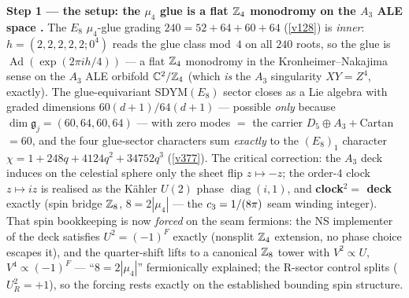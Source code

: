 \par\smallskip\noindent\textbf{Step 1 --- the setup: the $\mu_4$ glue is a flat $\mathbb{Z}_4$ monodromy on the
$A_3$ ALE space \mE.} The $E_8$ $\mu_4$-glue grading
$240=52{+}64{+}60{+}64$ (\vref{v128}) is \emph{inner}: $h=(2,2,2,2,2;0^4)$ reads the glue class mod~$4$
on all $240$ roots, so the glue is $\operatorname{Ad}(\exp(2\pi ih/4))$ --- a flat $\mathbb{Z}_4$ monodromy in
the Kronheimer--Nakajima sense on the $A_3$ ALE orbifold $\mathbb C^2/\mathbb{Z}_4$ (which \emph{is} the $A_3$
singularity $XY=Z^4$, exactly). The glue-equivariant SDYM$(E_8)$ sector closes as a Lie algebra with
graded dimensions $60(d{+}1)/64(d{+}1)$ --- possible \emph{only} because
$\dim\mathfrak g_j=(60,64,60,64)$ --- with zero modes $=$ the carrier $D_5{\oplus}A_3{+}$Cartan $=60$,
and the four glue-sector characters sum \emph{exactly} to the $(E_8)_1$ character
$\chi=1{+}248q{+}4124q^2{+}34752q^3$ (\vref{v377}). The critical correction: the $A_3$ deck induces on
the celestial sphere only the sheet flip $z\mapsto-z$; the order-$4$ clock $z\mapsto iz$ is realised as
the K\"ahler $U(2)$ phase $\operatorname{diag}(i,1)$, and \textbf{clock$^2=$ deck} exactly (spin bridge
$\mathbb{Z}_8$, $8=2|\mu_4|$ --- the $c_3=1/(8\pi)$ seam winding integer).
 That spin bookkeeping is now \emph{forced} on the seam
fermions: the NS implementer of the deck satisfies $U^2=(-1)^F$ exactly (nonsplit $\mathbb{Z}_4$ extension,
no phase choice escapes it), and the quarter-shift lifts to a canonical $\mathbb{Z}_8$ tower with
$V^2\propto U$, $V^4\propto(-1)^F$ --- ``$8=2|\mu_4|$'' fermionically explained; the R-sector
control splits ($U_R^2=+1$), so the forcing rests exactly on the established bounding spin
structure. 

